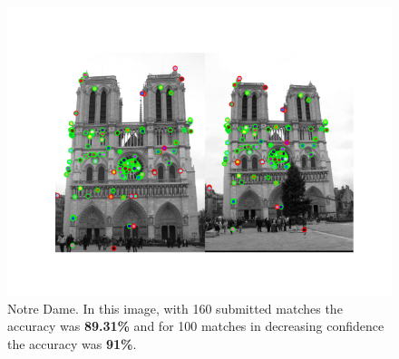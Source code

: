     \begin{figure}[htb!]
        \centering
        \includegraphics[width=15cm]{../eval_ND.png}
        \caption{Notre Dame. In this image, with 160 submitted matches the accuracy was \textbf{89.31\%} and for 100 matches in decreasing confidence the accuracy was \textbf{91\%}.}
        \label{fig:result1}
    \end{figure}
    
